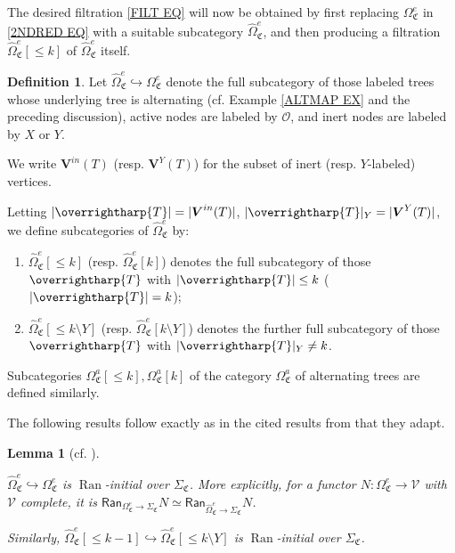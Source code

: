 \documentclass[a4paper,10pt
,draft
]{article}%
\numberwithin{equation}{section}
\numberwithin{figure}{section}
\newtheorem{lemma}[equation]{Lemma}%
\theoremstyle{definition} %
\newtheorem{definition}[equation]{Definition}%
\newcommand{\into}{\hookrightarrow}%
\newcommand{\vect}[1]{\text{\overrightharp{\ensuremath{#1}}}}
\DeclareMathOperator{\Ran}{Ran}%
\renewcommand{\O}{\ensuremath{\mathcal O}}
\newcommand{\1}{\ensuremath{\mathbbm 1}}%
\newcommand{\SC}{\Sigma_{\mathfrak C}}
\newcommand{\OC}{\Omega_{\mathfrak C}}
\begin{document}
The desired filtration \eqref{FILT EQ} will now be obtained by
first replacing $\Omega_{\mathfrak C}^e$ in \eqref{2NDRED EQ} with a suitable subcategory $\widehat{\Omega}_{\mathfrak C}^{e}$,
and then producing a filtration
$\widehat{\Omega}_{\mathfrak C}^{e}[\leq k]$
of 
$\widehat{\Omega}_{\mathfrak C}^{e}$ itself.






\begin{definition}
	Let
	$\widehat{\Omega}_{\mathfrak C}^{e} \hookrightarrow \Omega_{\mathfrak C}^{e}$
	denote the full subcategory of those labeled trees whose underlying tree is alternating
	(cf. Example \ref{ALTMAP EX} and the preceding discussion),
	active nodes are labeled by $\O$, 
	and inert nodes are labeled by $X$ or $Y$.
	
	We write $\boldsymbol{V}^{in}(T)$
	(resp. $\boldsymbol{V}^{Y}(T)$)
	for the subset of inert (resp. $Y$-labeled) vertices.
	
	Letting	$|\vect{T}| = |\boldsymbol{V}^{in}(T)|$,
	$|\vect{T}|_Y = |\boldsymbol{V}^{Y}(T)|$,
	we define subcategories of 
	$\widehat{\Omega}_{\mathfrak C}^{e}$ by:
	\begin{enumerate}[label=(\roman*)]
		\item $\widehat{\Omega}_{\mathfrak C}^{e}[\leq k]$ (resp. $\widehat{\Omega}_{\mathfrak C}^{e}[k]$)
		denotes the full subcategory of those $\vect{T}$ with $|\vect{T}| \leq k$ ($|\vect{T}|=k$);
		\item $\widehat{\Omega}_{\mathfrak C}^{e}[\leq k \setminus Y]$ (resp. $\widehat{\Omega}_{\mathfrak C}^{e}[k \setminus Y]$)
		denotes the further full subcategory of those $\vect{T}$ with $|\vect{T}|_Y \neq k$.
	\end{enumerate}
	Subcategories $\OC^a[\leq k], \OC^a[k]$ of the category $\OC^a$
	of alternating trees are defined similarly.
\end{definition}

The following results follow exactly as in the cited results from 
\cite{BP_geo} that they adapt.

\begin{lemma}[{cf. \cite[Cor. 5.62, Lemma 5.68]{BP_geo}}]
	\label{LANINT LEM}
	
	$\widehat\Omega_{\mathfrak C}^e \into 
	\Omega_{\mathfrak C}^e$
	is $\Ran$-initial over $\SC$.
	More explicitly, for a functor
	$N\colon \Omega_{\mathfrak C}^e \to \mathcal{V}$
	with $\mathcal{V}$ complete,
	it is
	$\mathsf{Ran}_{\Omega_{\mathfrak C}^e \to \Sigma_{\mathfrak{C}}}
	N \simeq 
	\mathsf{Ran}_{\widehat\Omega_{\mathfrak C}^e \to \Sigma_{\mathfrak{C}}} N$.	
	
	Similarly, $\widehat\Omega_{\mathfrak C}^e[\leq k-1] \into 
	\widehat\Omega_{\mathfrak C}^e[\leq k \setminus Y]$
	is $\Ran$-initial over $\SC$.
\end{lemma}
\end{document}

